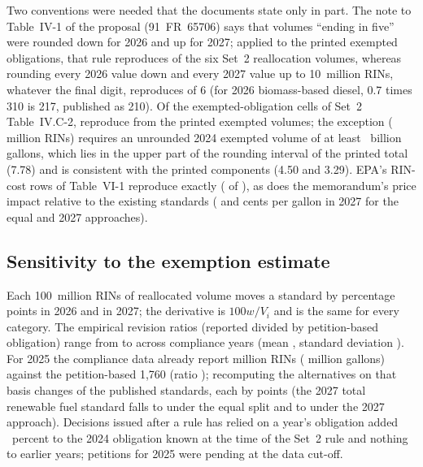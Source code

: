 \documentclass[preprint,12pt,authoryear]{elsarticle}
\begin{document}
Two conventions were needed that the documents state only in part. The note to Table~IV-1 of the proposal (91~FR~65706) says that volumes ``ending in five'' were rounded down for 2026 and up for 2027; applied to the printed exempted obligations, that rule reproduces \valnSrervNearestMatched{} of the six Set~2 reallocation volumes, whereas rounding every 2026 value down and every 2027 value up to 10~million RINs, whatever the final digit, reproduces \valnSrervFloorCeilMatched{} of 6 (for 2026 biomass-based diesel, 0.7 times 310 is 217, published as 210). Of the \valnErvoChecked{} exempted-obligation cells of Set~2 Table~IV.C-2, \valnErvoMatched{} reproduce from the printed exempted volumes; the exception (\valervoMismatchDescription{} million RINs) requires an unrounded 2024 exempted volume of at least \valervoMismatchMinVolumeBgal{}~billion gallons, which lies in the upper part of the rounding interval of the printed total (7.78) and is consistent with the printed components (4.50 and 3.29). EPA's RIN-cost rows of Table~VI-1 reproduce exactly (\valnCostMatched{} of \valnCostChecked), as does the memorandum's price impact relative to the existing standards (\valcostRelSecondEqual{} and \valcostRelSecondAllTwoZeroTwoSeven{} cents per gallon in 2027 for the equal and 2027 approaches).

\subsection{Sensitivity to the exemption estimate}

Each 100~million RINs of reallocated volume moves a standard by \valdStdPerOneZeroZeroMRinsFirst{} percentage points in 2026 and \valdStdPerOneZeroZeroMRinsSecond{} in 2027; the derivative is $100 w/V_i$ and is the same for every category. The empirical revision ratios (reported divided by petition-based obligation) range from \valrevisionRatioMin{} to \valrevisionRatioMax{} across \valnRevisionPairs{} compliance years (mean \valrevisionRatioMean{}, standard deviation \valrevisionRatioSd{}). For 2025 the compliance data already report \valreportedTwoZeroTwoFiveExemptedRvo{} million RINs (\valreportedTwoZeroTwoFiveExemptedVolume{} million gallons) against the petition-based 1,760 (ratio \valreportedTwoZeroTwoFiveRatio); recomputing the alternatives on that basis changes \valnStandardsChangedByReportedBasis{} of the published standards, each by \valreportedBasisMaxChangePoints{} points (the 2027 total renewable fuel standard falls to \valreportedBasisStdSecondEqual{} under the equal split and to \valreportedBasisStdSecondAllSecond{} under the 2027 approach). Decisions issued after a rule has relied on a year's obligation added \vallaterShareTwoZeroTwoFourPct{}~percent to the 2024 obligation known at the time of the Set~2 rule and nothing to earlier years; \valnPendingTwoZeroTwoFive{} petitions for 2025 were pending at the data cut-off.
\end{document}
